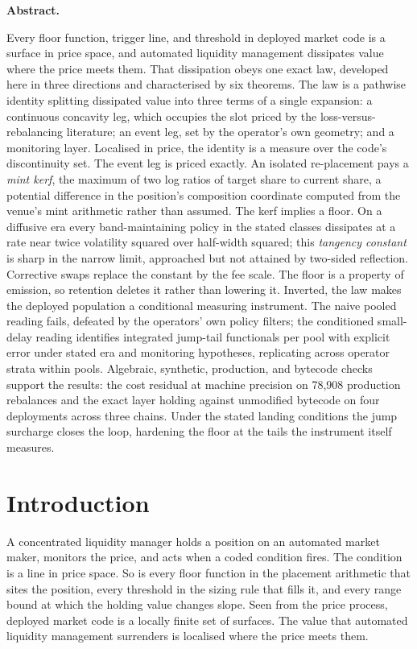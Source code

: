 \documentclass[11pt,a4paper]{article}
\renewenvironment{abstract}{%
  \fontsize{10pt}{13pt}\selectfont
  \begin{list}{}{%
    \setlength{\leftmargin}{0.5in}%
    \setlength{\rightmargin}{0.5in}%
    \setlength{\listparindent}{0pt}%
    \setlength{\parsep}{6pt plus 2pt minus 1pt}%
    \setlength{\topsep}{0pt}%
    \setlength{\partopsep}{0pt}%
  }\item[]\noindent\textbf{Abstract.}\hspace{0.5em}\ignorespaces
}{\end{list}}
\theoremstyle{definition}
\theoremstyle{plain}
\theoremstyle{remark}
\begin{document}
\begin{abstract}
Every floor function, trigger line, and threshold in deployed market code is a surface in price space, and automated liquidity management
dissipates value where the price meets them. That dissipation obeys one exact law, developed here in three directions and characterised by six theorems. 
The law is a pathwise identity splitting dissipated value into three terms of a single expansion: a continuous concavity leg, which occupies the slot priced by the
loss-versus-rebalancing literature; an event leg, set by the operator's own geometry; and a monitoring layer. Localised in price, the identity is a
measure over the code's discontinuity set. The event leg is priced exactly. An isolated re-placement pays a \emph{mint kerf}, the maximum of two log ratios of 
target share to current share, a potential difference in the position's composition coordinate computed from the venue's mint arithmetic rather than assumed. The
kerf implies a floor. On a diffusive era every band-maintaining policy in the stated classes dissipates at a rate near twice volatility squared over half-width squared; 
this \emph{tangency constant} is sharp in the narrow limit, approached but not attained by two-sided reflection. Corrective swaps replace the constant by the fee scale.
The floor is a property of emission, so retention deletes it rather than lowering it. Inverted, the law makes the deployed population a conditional measuring instrument. 
The naive pooled reading fails, defeated by the operators' own policy filters; the conditioned small-delay reading identifies integrated jump-tail functionals per pool with 
explicit error under stated era and monitoring hypotheses, replicating across operator strata within pools. Algebraic, synthetic, production, and bytecode checks support
the results: the cost residual at machine precision on 78{,}908 production rebalances and the exact layer holding against unmodified bytecode on four deployments across 
three chains. Under the stated landing conditions the jump surcharge closes the loop, hardening the floor at the tails the instrument itself measures.
\end{abstract}

\section{Introduction}\label{sec:intro}
A concentrated liquidity manager holds a position on an automated market maker, monitors the price, and acts when a coded condition
fires. The condition is a line in price space. So is every floor function in the placement arithmetic that sites the position, every
threshold in the sizing rule that fills it, and every range bound at which the holding value changes slope. Seen from the price process,
deployed market code is a locally finite set of surfaces. The value that automated liquidity management surrenders is localised
where the price meets them.
\end{document}
